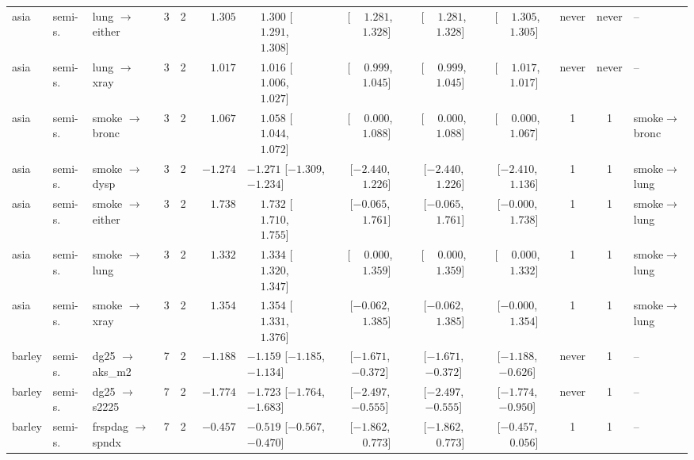\begin{landscape}
\begin{longtable}{@{}llp{2.15cm}ccrl cccc c l@{}}
asia & semi-s. & lung $\to$ either & 3 & 2 & $\phantom{-}1.305$ & $\phantom{-}1.300$ [$\phantom{-}1.291$, $\phantom{-}1.308$] & [$\phantom{-}1.281$, $\phantom{-}1.328$] & [$\phantom{-}1.281$, $\phantom{-}1.328$] & [$\phantom{-}1.305$, $\phantom{-}1.305$] & never & never & -- \\
asia & semi-s. & lung $\to$ xray & 3 & 2 & $\phantom{-}1.017$ & $\phantom{-}1.016$ [$\phantom{-}1.006$, $\phantom{-}1.027$] & [$\phantom{-}0.999$, $\phantom{-}1.045$] & [$\phantom{-}0.999$, $\phantom{-}1.045$] & [$\phantom{-}1.017$, $\phantom{-}1.017$] & never & never & -- \\
asia & semi-s. & smoke $\to$ bronc & 3 & 2 & $\phantom{-}1.067$ & $\phantom{-}1.058$ [$\phantom{-}1.044$, $\phantom{-}1.072$] & [$\phantom{-}0.000$, $\phantom{-}1.088$] & [$\phantom{-}0.000$, $\phantom{-}1.088$] & [$\phantom{-}0.000$, $\phantom{-}1.067$] & 1 & 1 & smoke$\to$bronc \\
asia & semi-s. & smoke $\to$ dysp & 3 & 2 & $-1.274$ & $-1.271$ [$-1.309$, $-1.234$] & [$-2.440$, $\phantom{-}1.226$] & [$-2.440$, $\phantom{-}1.226$] & [$-2.410$, $\phantom{-}1.136$] & 1 & 1 & smoke$\to$lung \\
asia & semi-s. & smoke $\to$ either & 3 & 2 & $\phantom{-}1.738$ & $\phantom{-}1.732$ [$\phantom{-}1.710$, $\phantom{-}1.755$] & [$-0.065$, $\phantom{-}1.761$] & [$-0.065$, $\phantom{-}1.761$] & [$-0.000$, $\phantom{-}1.738$] & 1 & 1 & smoke$\to$lung \\
asia & semi-s. & smoke $\to$ lung & 3 & 2 & $\phantom{-}1.332$ & $\phantom{-}1.334$ [$\phantom{-}1.320$, $\phantom{-}1.347$] & [$\phantom{-}0.000$, $\phantom{-}1.359$] & [$\phantom{-}0.000$, $\phantom{-}1.359$] & [$\phantom{-}0.000$, $\phantom{-}1.332$] & 1 & 1 & smoke$\to$lung \\
asia & semi-s. & smoke $\to$ xray & 3 & 2 & $\phantom{-}1.354$ & $\phantom{-}1.354$ [$\phantom{-}1.331$, $\phantom{-}1.376$] & [$-0.062$, $\phantom{-}1.385$] & [$-0.062$, $\phantom{-}1.385$] & [$-0.000$, $\phantom{-}1.354$] & 1 & 1 & smoke$\to$lung \\
barley & semi-s. & dg25 $\to$ aks\_\allowbreak{}m2 & 7 & 2 & $-1.188$ & $-1.159$ [$-1.185$, $-1.134$] & [$-1.671$, $-0.372$] & [$-1.671$, $-0.372$] & [$-1.188$, $-0.626$] & never & 1 & -- \\
barley & semi-s. & dg25 $\to$ s2225 & 7 & 2 & $-1.774$ & $-1.723$ [$-1.764$, $-1.683$] & [$-2.497$, $-0.555$] & [$-2.497$, $-0.555$] & [$-1.774$, $-0.950$] & never & 1 & -- \\
barley & semi-s. & frspdag $\to$ spndx & 7 & 2 & $-0.457$ & $-0.519$ [$-0.567$, $-0.470$] & [$-1.862$, $\phantom{-}0.773$] & [$-1.862$, $\phantom{-}0.773$] & [$-0.457$, $\phantom{-}0.056$] & 1 & 1 & -- \\

\end{longtable}
\end{landscape}
